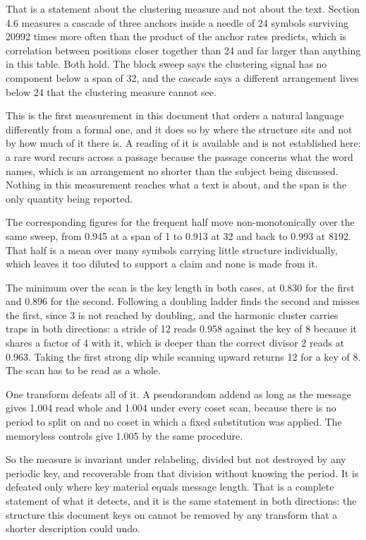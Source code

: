 That is a statement about the clustering measure and not about the text. Section 4.6 measures a cascade of three anchors inside a needle of 24 symbols surviving 20992 times more often than the product of the anchor rates predicts, which is correlation between positions closer together than 24 and far larger than anything in this table. Both hold. The block sweep says the clustering signal has no component below a span of 32, and the cascade says a different arrangement lives below 24 that the clustering measure cannot see.

This is the first measurement in this document that orders a natural language differently from a formal one, and it does so by where the structure sits and not by how much of it there is. A reading of it is available and is not established here: a rare word recurs across a passage because the passage concerns what the word names, which is an arrangement no shorter than the subject being discussed. Nothing in this measurement reaches what a text is about, and the span is the only quantity being reported.

The corresponding figures for the frequent half move non-monotonically over the same sweep, from 0.945 at a span of 1 to 0.913 at 32 and back to 0.993 at 8192. That half is a mean over many symbols carrying little structure individually, which leaves it too diluted to support a claim and none is made from it.

The minimum over the scan is the key length in both cases, at 0.830 for the first and 0.896 for the second. Following a doubling ladder finds the second and misses the first, since 3 is not reached by doubling, and the harmonic cluster carries traps in both directions: a stride of 12 reads 0.958 against the key of 8 because it shares a factor of 4 with it, which is deeper than the correct divisor 2 reads at 0.963. Taking the first strong dip while scanning upward returns 12 for a key of 8. The scan has to be read as a whole.

One transform defeats all of it. A pseudorandom addend as long as the message gives 1.004 read whole and 1.004 under every coset scan, because there is no period to split on and no coset in which a fixed substitution was applied. The memoryless controls give 1.005 by the same procedure.

So the measure is invariant under relabeling, divided but not destroyed by any periodic key, and recoverable from that division without knowing the period. It is defeated only where key material equals message length. That is a complete statement of what it detects, and it is the same statement in both directions: the structure this document keys on cannot be removed by any transform that a shorter description could undo.

